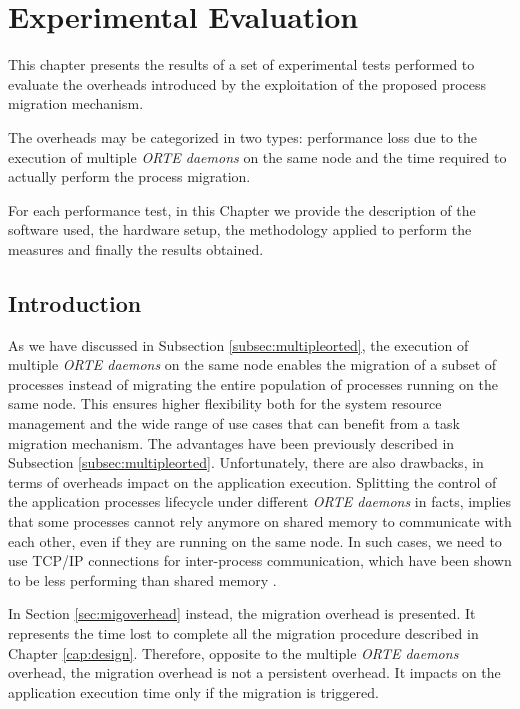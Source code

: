 \chapter{Experimental Evaluation}
\label{cap:evaluation}

This chapter presents the results of a set of experimental tests performed to
evaluate the overheads introduced by the exploitation of the proposed process
migration mechanism.

The overheads may be categorized in two types: performance loss due to the
execution of multiple \emph{ORTE daemons} on the same node and the time
required to actually perform the process migration.

For each performance test, in this Chapter we provide the description of the software used, the hardware setup, the methodology applied to perform the measures and finally the results obtained.

\section{Introduction}
As we have discussed in Subsection \ref{subsec:multipleorted}, the execution of
multiple \emph{ORTE daemons} on the same node enables the migration of a subset
of processes instead of migrating the entire population of processes running
on the same node. This
ensures higher flexibility both for the system resource management and the
wide range of use cases that can benefit from a task migration mechanism. The
advantages have been previously described in
Subsection \ref{subsec:multipleorted}.
Unfortunately, there are also drawbacks, in terms of overheads impact on the
application execution. Splitting the control of the application processes
lifecycle under different \emph{ORTE daemons} in facts, implies that some processes cannot rely
anymore on shared memory to communicate with each other, even if they are
running on the same node. In such cases, we need to use TCP/IP connections for
inter-process communication, which have been shown to be less performing than
shared memory \cite{graham2005open}.

In Section \ref{sec:migoverhead} instead, the migration overhead is presented.
It represents the time lost to complete all the migration procedure described
in Chapter \ref{cap:design}. Therefore, opposite to the multiple \emph{ORTE
daemons} overhead, the migration overhead is not a persistent overhead. It
impacts on the application execution time only if the migration is triggered.

